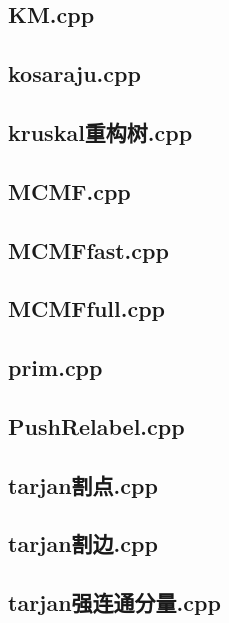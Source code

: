\subsection{KM.cpp}


\subsection{kosaraju.cpp}


\subsection{kruskal重构树.cpp}


\subsection{MCMF.cpp}


\subsection{MCMFfast.cpp}


\subsection{MCMFfull.cpp}


\subsection{prim.cpp}


\subsection{PushRelabel.cpp}


\subsection{tarjan割点.cpp}


\subsection{tarjan割边.cpp}


\subsection{tarjan强连通分量.cpp}


